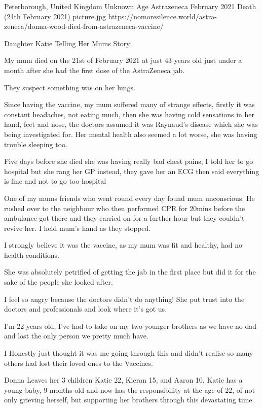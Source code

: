 {Peterborough, United Kingdom}
{Unknown Age}
{Astrazeneca}
{February 2021}
{Death (21th February 2021)}
{picture.jpg}
{https://nomoresilence.world/astra-zeneca/donna-wood-died-from-astrazeneca-vaccine/}
{

Daughter Katie Telling Her Mums Story:

My mum died on the 21st of February 2021 at just 43 years old just under a month
after she had the first dose of the AstraZeneca jab.

They suspect something was on her lungs.

Since having the vaccine, my mum suffered many of strange effects, firstly it
was constant headaches, not eating much, then she was having cold sensations in
her hand, feet and nose, the doctors assumed it was Raynaud’s disease which she
was being investigated for. Her mental health also seemed a lot worse, she was
having trouble sleeping too.

Five days before she died she was having really bad chest pains, I told her to
go hospital but she rang her GP instead, they gave her an ECG then said
everything is fine and not to go too hospital

One of my mums friends who went round every day found mum unconscious. He rushed
over to the neighbour who then performed CPR for 20mins before the ambulance got
there and they carried on for a further hour but they couldn’t revive her. I
held mum’s hand as they stopped.

I strongly believe it was the vaccine, as my mum was fit and healthy, had no
health conditions.

She was absolutely petrified of getting the jab in the first place but did it
for the sake of the people she looked after.

I feel so angry because the doctors didn’t do anything! She put trust into the
doctors and professionals and look where it’s got us.

I’m 22 years old, I’ve had to take on my two younger brothers as we have no dad
and lost the only person we pretty much have.

I Honestly just thought it was me going through this and didn’t realise so many
others had lost their loved ones to the Vaccines.

Donna Leaves her 3 children Katie 22, Kieran 15, and Aaron 10. Katie has a young
baby, 9 months old and now has the responsibility at the age of 22, of not only
grieving herself, but supporting her brothers through this devastating time.  }
